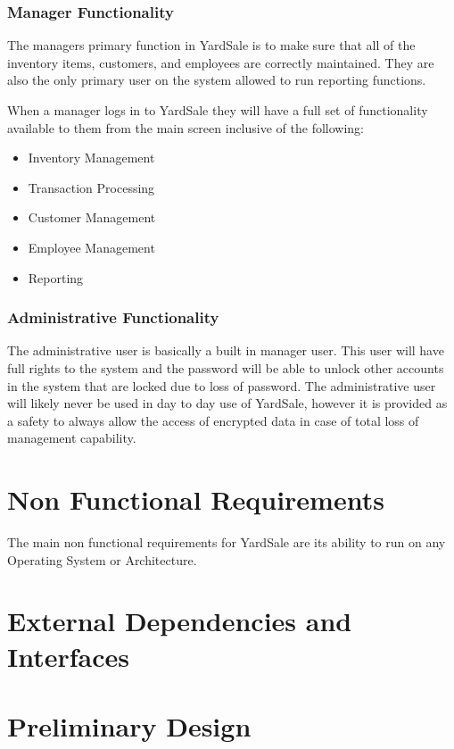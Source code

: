 \documentclass{book}
\begin{document}
\subsubsection{Manager Functionality}

The managers primary function in YardSale is to make sure that all of the inventory items, customers, and employees are correctly maintained. They are also the only primary user on the system allowed to run reporting functions.

When a manager logs in to YardSale they will have a full set of functionality available to them from the main screen inclusive of the following:

\begin{itemize}
\item Inventory Management
\item Transaction Processing
\item Customer Management
\item Employee Management
\item Reporting
\end{itemize}

\subsubsection{Administrative Functionality}

The administrative user is basically a built in manager user. This user will have full rights to the system and the password will be able to unlock other accounts in the system that are locked due to loss of password. The administrative user will likely never be used in day to day use of YardSale, however it is provided as a safety to always allow the access of encrypted data in case of total loss of management capability.

\section{Non Functional Requirements}

The main non functional requirements for YardSale are its ability to run on any Operating System or Architecture.

\section{External Dependencies and Interfaces}

\section{Preliminary Design}
\end{document}
